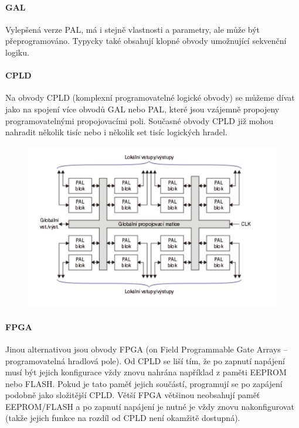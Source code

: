 \vspace{25mm}
\paragraph{GAL}
Vylepšená verze PAL, má i stejně vlastnosti a parametry, ale může být přeprogramováno. Typycky také obsahují klopné obvody umožnující sekvenční logiku.

\paragraph{CPLD}
Na obvody CPLD (komplexní programovatelné logické obvody) se můžeme dívat jako na spojení více obvodů GAL nebo PAL, které jsou vzájemně propojeny programovatelnými propojovacími poli. Současné obvody CPLD již mohou nahradit několik tisíc nebo i několik set tisíc logických hradel. 

\begin{figure}[h!]
    \centering
    \includegraphics[scale=0.2]{sections/3_pld_npld/images/Screenshot 2024-08-22 173733.png}
\end{figure}

\vspace{25mm}

\paragraph{FPGA}
Jinou alternativou jsou obvody FPGA (on Field Programmable Gate Arrays – programovatelná hradlová pole). Od CPLD se liší tím, že po zapnutí napájení musí být jejich konfigurace vždy znovu nahrána například z paměti EEPROM nebo FLASH. Pokud je tato paměť jejich součástí, programují se po zapájení podobně jako složitější CPLD. Větší FPGA většinou neobsahují paměť EEPROM/FLASH a po zapnutí napájení je nutné je vždy znovu nakonfigurovat (takže jejich funkce na rozdíl od CPLD není okamžitě dostupná).

